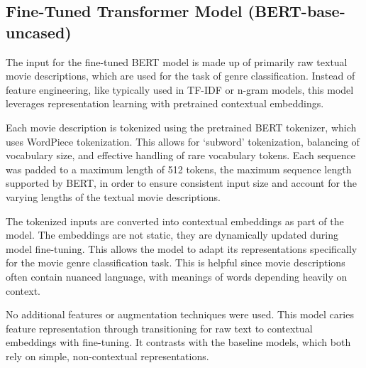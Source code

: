 \subsection{Fine-Tuned Transformer Model (BERT-base-uncased)}
The input for the fine-tuned BERT model is made up of primarily raw textual movie descriptions, which are used for the task of genre classification. Instead of feature engineering, like typically used in TF-IDF or n-gram models, this model leverages representation learning with pretrained contextual embeddings. 

Each movie description is tokenized using the pretrained BERT tokenizer, which uses WordPiece tokenization. This allows for ‘subword’ tokenization, balancing of vocabulary size, and effective handling of rare vocabulary tokens. Each sequence was padded to a maximum length of 512 tokens, the maximum sequence length supported by BERT, in order to ensure consistent input size and account for the varying lengths of the textual movie descriptions. 

The tokenized inputs are converted into contextual embeddings as part of the model. The embeddings are not static, they are dynamically updated during model fine-tuning. This allows the model to adapt its representations specifically for the movie genre classification task. This is helpful since movie descriptions often contain nuanced language, with meanings of words depending heavily on context.

No additional features or augmentation techniques were used. This model caries feature representation through transitioning for raw text to contextual embeddings with fine-tuning. It contrasts with the baseline models, which both rely on simple, non-contextual representations. 

